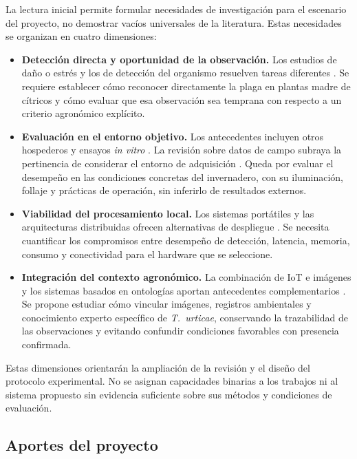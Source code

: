 La lectura inicial permite formular necesidades de investigación para el
escenario del proyecto, no demostrar vacíos universales de la literatura.
Estas necesidades se organizan en cuatro dimensiones:
\begin{itemize}
    \item \textbf{Detección directa y oportunidad de la observación.}
    Los estudios de daño o estrés y los de detección del organismo resuelven
    tareas diferentes \cite{nieuwenhuizen2020,neto2026early,zhou2023}.
    Se requiere establecer cómo reconocer directamente la plaga en plantas
    madre de cítricos y cómo evaluar que esa observación sea temprana con
    respecto a un criterio agronómico explícito.
    \item \textbf{Evaluación en el entorno objetivo.}
    Los antecedentes incluyen otros hospederos y ensayos \textit{in vitro}
    \cite{zhou2023,wiseman2025invitro}. La revisión sobre datos de campo
    subraya la pertinencia de considerar el entorno de adquisición
    \cite{jelali2024}. Queda por evaluar el desempeño en las condiciones
    concretas del invernadero, con su iluminación, follaje y prácticas de
    operación, sin inferirlo de resultados externos.
    \item \textbf{Viabilidad del procesamiento local.}
    Los sistemas portátiles y las arquitecturas distribuidas ofrecen
    alternativas de despliegue \cite{wang2021portable,yu2025}. Se necesita
    cuantificar los compromisos entre desempeño de detección, latencia,
    memoria, consumo y conectividad para el hardware que se seleccione.
    \item \textbf{Integración del contexto agronómico.}
    La combinación de IoT e imágenes y los sistemas basados en ontologías
    aportan antecedentes complementarios
    \cite{quispe2024lora,umar2024ontology}. Se propone estudiar cómo vincular
    imágenes, registros ambientales y conocimiento experto específico de
    \textit{T.~urticae}, conservando la trazabilidad de las observaciones y
    evitando confundir condiciones favorables con presencia confirmada.
\end{itemize}

Estas dimensiones orientarán la ampliación de la revisión y el diseño del
protocolo experimental. No se asignan capacidades binarias a los trabajos ni
al sistema propuesto sin evidencia suficiente sobre sus métodos y condiciones
de evaluación.

\subsection{Aportes del proyecto}
\label{subsec:aportes-proyecto}

